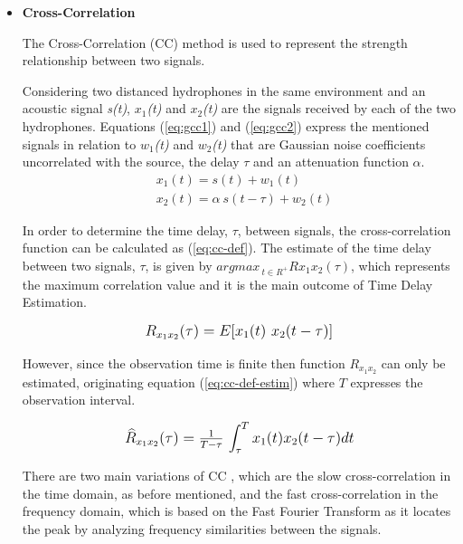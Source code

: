 \begin{itemize}
	\item \textbf{Cross-Correlation}

The Cross-Correlation (CC) method  is used to represent the strength relationship between two signals. 

Considering two distanced hydrophones in the same environment and an acoustic signal \textit{s(t)}, \textit{$x_1$(t)} and \textit{$x_2$(t)} are the signals received by each of the two hydrophones. Equations (\ref{eq:gcc1}) and (\ref{eq:gcc2})\cite{crosscorr-76} express the mentioned signals in relation to \textit{$w_1$(t)} and \textit{$w_2$(t)} that are Gaussian noise coefficients uncorrelated with the source, the delay $\tau$ and an attenuation function $\alpha$.
\begin{eqnarray}
	&x_1(t) = s(t) + w_1(t)
	\label{eq:gcc1}\\
	&x_2(t) = \alpha \ s(t - \tau) + w_2(t)
	\label{eq:gcc2}
\end{eqnarray}

In order to determine the time delay, $\tau$, between signals, the cross-correlation function can be calculated as (\ref{eq:cc-def}). The estimate of the time delay between two signals, $\tau$, is given by $arg max_{\ t\in R^+} Rx_1x_2(\tau)$, which represents the maximum correlation value and it is the main outcome of Time Delay Estimation. 

\begin{equation}
	\mbox{\large\( %
	R_{x_1x_2}(\tau) = E[x_1(t) \ x_2(t- \tau)]
	\)} %
\label{eq:cc-def}
\end{equation}

However, since the observation time is finite then function $R_{x_1x_2}$ can only be estimated, originating equation (\ref{eq:cc-def-estim}) where $T$ expresses the observation interval.

\begin{equation}
	\mbox{\large\( %
	\widehat R_{x_1x_2}(\tau) = \frac{1}{T - \tau} \ \mathlarger{\int_{\tau}^{T} x_1(t)x_2(t - \tau)} dt
	\)} %
\label{eq:cc-def-estim}
\end{equation}
	
There are two main variations of CC \cite{crosscorr}, which are the slow cross-correlation in the  time domain, as before mentioned, and the fast cross-correlation in the frequency domain, which is based on the Fast Fourier Transform as it locates the peak by analyzing frequency similarities between the signals. 
	

\end{itemize}
